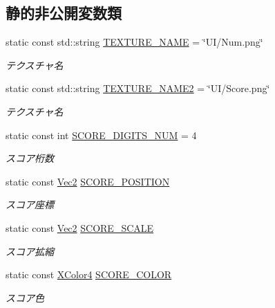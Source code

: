 \subsection*{静的非公開変数類}
\begin{DoxyCompactItemize}
\item 
static const std\+::string \mbox{\hyperlink{class_score_draw_a6740fd10a056c8a0c88503c32599a18d}{T\+E\+X\+T\+U\+R\+E\+\_\+\+N\+A\+ME}} = \char`\"{}UI/Num.\+png\char`\"{}
\begin{DoxyCompactList}\small\item\em テクスチャ名 \end{DoxyCompactList}\item 
static const std\+::string \mbox{\hyperlink{class_score_draw_a8fe0ac3639debfcda2422a92c61cc463}{T\+E\+X\+T\+U\+R\+E\+\_\+\+N\+A\+M\+E2}} = \char`\"{}UI/Score.\+png\char`\"{}
\begin{DoxyCompactList}\small\item\em テクスチャ名 \end{DoxyCompactList}\item 
static const int \mbox{\hyperlink{class_score_draw_a8ef95916a22ebdbb2cca762e77852e91}{S\+C\+O\+R\+E\+\_\+\+D\+I\+G\+I\+T\+S\+\_\+\+N\+UM}} = 4
\begin{DoxyCompactList}\small\item\em スコア桁数 \end{DoxyCompactList}\item 
static const \mbox{\hyperlink{_vector3_d_8h_a5ef6e95dfc5f9d3820b71772d99bbc25}{Vec2}} \mbox{\hyperlink{class_score_draw_ae95821c251d07c3f9a417837864764a8}{S\+C\+O\+R\+E\+\_\+\+P\+O\+S\+I\+T\+I\+ON}}
\begin{DoxyCompactList}\small\item\em スコア座標 \end{DoxyCompactList}\item 
static const \mbox{\hyperlink{_vector3_d_8h_a5ef6e95dfc5f9d3820b71772d99bbc25}{Vec2}} \mbox{\hyperlink{class_score_draw_aae1d38a0a9ae7fd3b2fb5c04e7e26bf4}{S\+C\+O\+R\+E\+\_\+\+S\+C\+A\+LE}}
\begin{DoxyCompactList}\small\item\em スコア拡縮 \end{DoxyCompactList}\item 
static const \mbox{\hyperlink{_vector3_d_8h_a680c30c4a07d86fe763c7e01169cd6cc}{X\+Color4}} \mbox{\hyperlink{class_score_draw_abeef79f9add7ce6d4f92eea6d2212baa}{S\+C\+O\+R\+E\+\_\+\+C\+O\+L\+OR}}
\begin{DoxyCompactList}\small\item\em スコア色 \end{DoxyCompactList}\end{DoxyCompactItemize}


